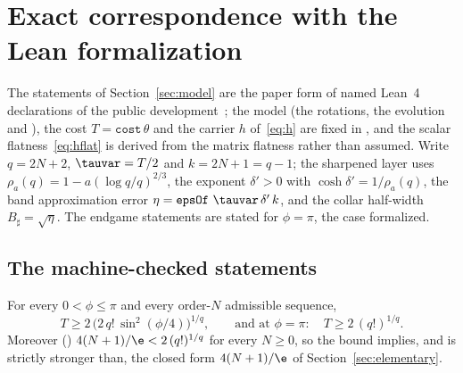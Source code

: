 \section{Exact correspondence with the Lean formalization}
\label{sec:formal}

The statements of Section~\ref{sec:model} are the paper form of named Lean~4 declarations of the
public development~\cite{LeanRepo}; the model (the rotations, the evolution and
), the cost $T=\texttt{cost}\,\theta$ and the carrier
$h$ of~\eqref{eq:h} are fixed in , and the scalar flatness~\eqref{eq:hflat} is derived from the matrix flatness rather than assumed. Write $q=2N+2$,
$\tauvar=T/2$ and $k=2N+1=q-1$; the
sharpened layer uses $\rho_a(q)=1-a(\log q/q)^{2/3}$, the exponent $\delta'>0$ with
$\cosh\delta'=1/\rho_a(q)$, the band approximation error
$\eta=\texttt{epsOf}\ \tauvar\,\delta'\,k$, and the collar half-width $B_\sharp=\sqrt\eta$. The endgame
statements are stated for $\phi=\pi$, the case formalized.

\subsection{The machine-checked statements}

\begin{theorem}
\label{thm:formal-elementary}
For every $0<\phi\le\pi$ and every order-$N$ admissible sequence,
\begin{equation}
T\ge2\,\bigl(2\,q!\,\sin^{2}(\phi/4)\bigr)^{1/q},
\qquad\text{and at }\phi=\pi:\quad T\ge2\,(q!)^{1/q}.
\label{eq:formal-elementary}
\end{equation}
Moreover
() $4(N+1)/\e<2\,(q!)^{1/q}$ for every $N\ge0$, so the
bound implies, and is strictly stronger than, the closed form $4(N+1)/\e$ of
Section~\ref{sec:elementary}.
\end{theorem}

